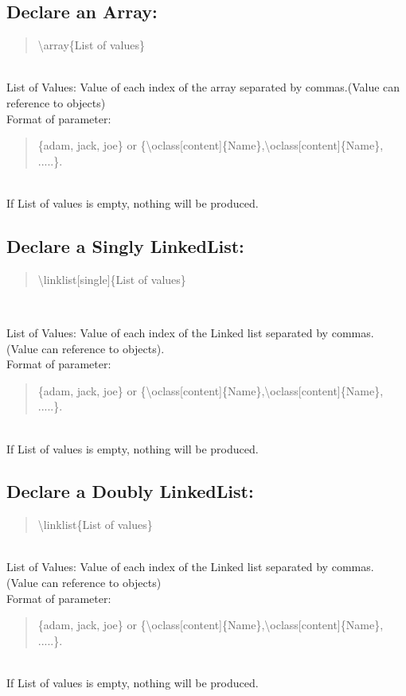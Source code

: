 \documentclass[10pt,a4paper,english]{article}
\begin{document}
\begin{flushleft}
\subsection*{Declare an Array:}
\begin{quote}{\ttfamily \raggedright \noindent
{\textbackslash}array{\{}List of values{\}} 
}\end{quote}
~\\ \medskip
List of Values: Value of each index of the array separated by commas.(Value can reference to objects)
~\\ \medskip
Format of parameter:
~\\
\begin{quote}{\ttfamily \raggedright \noindent
{\{}adam, jack, joe{\}} or {\{}{\textbackslash}oclass[content]{\{}Name{\}},{\textbackslash}oclass[content]{\{}Name{\}}, .....{\}}. 
}\end{quote}
~\\
If List of values is empty, nothing will be produced.

\subsection*{Declare a Singly LinkedList:}
\begin{quote}{\ttfamily \raggedright \noindent
{\textbackslash}linklist[single]{{\{}List of values{\}} 
}}\end{quote}
~\\ \medskip

List of Values: Value of each index of the Linked list separated by commas. (Value can reference to objects). 
~\\ \medskip
Format of parameter:
~\\
\begin{quote}{\ttfamily \raggedright \noindent
{\{}adam, jack, joe{\}} or {\{}{\textbackslash}oclass[content]{\{}Name{\}},{\textbackslash}oclass[content]{\{}Name{\}}, .....{\}}. 
}\end{quote} ~\\
If List of values is empty, nothing will be produced.

\subsection*{Declare a Doubly LinkedList:}
\begin{quote}{\ttfamily \raggedright \noindent
{\textbackslash}linklist{\{}List of values{\}} 
}\end{quote}
~\\ \medskip
List of Values: Value of each index of the Linked list separated by commas. (Value can reference to objects) 
~\\ \medskip
Format of parameter:
~\\
\begin{quote}{\ttfamily \raggedright \noindent
{\{}adam, jack, joe{\}} or {\{}{\textbackslash}oclass[content]{\{}Name{\}},{\textbackslash}oclass[content]{\{}Name{\}}, .....{\}}. 
}\end{quote}
~\\
If List of values is empty, nothing will be produced.



\end{flushleft}
\end{document}
